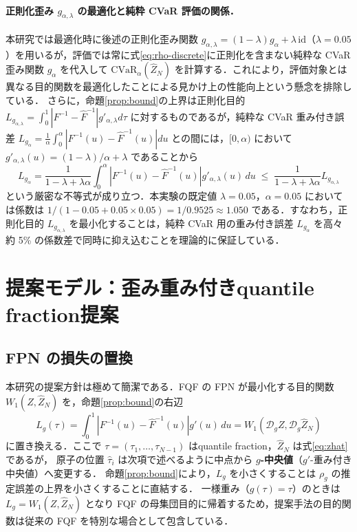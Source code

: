 \documentclass[a4paper,10pt]{jsarticle}
\theoremstyle{definition}
\newcommand{\CVaR}{\mathrm{CVaR}}
\newcommand{\Wone}{W_1}
\newcommand{\Finv}{F^{-1}}
\newcommand{\Fhinv}{\hat{F}^{-1}}
\newcommand{\dist}{\mathcal{D}_g}
\begin{document}
\paragraph{正則化歪み $g_{\alpha,\lambda}$ の最適化と純粋 CVaR 評価の関係．}
本研究では最適化時に後述の正則化歪み関数 $g_{\alpha,\lambda}=(1-\lambda)g_\alpha+\lambda\,\mathrm{id}$（$\lambda=0.05$）を用いるが，評価では常に式\eqref{eq:rho-discrete}に正則化を含まない純粋な CVaR 歪み関数 $g_\alpha$ を代入して $\CVaR_\alpha(\hat Z_N)$ を計算する．これにより，評価対象とは異なる目的関数を最適化したことによる見かけ上の性能向上という懸念を排除している．
さらに，命題\ref{prop:bound}の上界は正則化目的 $L_{g_{\alpha,\lambda}}=\int_0^1|\Finv-\Fhinv|g'_{\alpha,\lambda}d\tau$ に対するものであるが，純粋な CVaR 重み付き誤差 $L_{g_\alpha}=\frac1\alpha\int_0^\alpha|\Finv(u)-\Fhinv(u)|du$ との間には，$[0,\alpha)$ において $g'_{\alpha,\lambda}(u)=(1-\lambda)/\alpha+\lambda$ であることから
\begin{equation}
  L_{g_\alpha}=\frac{1}{1-\lambda+\lambda\alpha}\int_0^\alpha|\Finv(u)-\Fhinv(u)|g'_{\alpha,\lambda}(u)\,du
  \;\le\; \frac{1}{1-\lambda+\lambda\alpha} L_{g_{\alpha,\lambda}}
  \label{eq:reg-bound-relation}
\end{equation}
という厳密な不等式が成り立つ．本実験の既定値 $\lambda=0.05$，$\alpha=0.05$ においては係数は $1/(1-0.05+0.05\times0.05)=1/0.9525\approx1.050$ である．すなわち，正則化目的 $L_{g_{\alpha,\lambda}}$ を最小化することは，純粋 CVaR 用の重み付き誤差 $L_{g_\alpha}$ を高々約 5\% の係数差で同時に抑え込むことを理論的に保証している．

\section{提案モデル：歪み重み付きquantile fraction提案}
\label{sec:proposed}

\subsection{FPN の損失の置換}
本研究の提案方針は極めて簡潔である．FQF の FPN が最小化する目的関数
$\Wone(Z,\hat Z_N)$ を，命題\ref{prop:bound}の右辺
\begin{equation}
  L_g(\tau)=\int_0^1\left|\Finv(u)-\Fhinv(u)\right|g'(u)\,du=\Wone(\dist Z,\dist\hat Z_N)
  \label{eq:Lg}
\end{equation}
に置き換える．ここで $\tau=(\tau_1,\dots,\tau_{N-1})$ はquantile fraction，$\hat Z_N$ は式\eqref{eq:zhat}であるが，
原子の位置 $\hat\tau_i$ は次項で述べるように中点から \textbf{$g$-中央値}（$g'$-重み付き中央値）へ変更する．
命題\ref{prop:bound}により，$L_g$ を小さくすることは $\rho_g$ の推定誤差の上界を小さくすることに直結する．
一様重み（$g(\tau)=\tau$）のときは $L_g=\Wone(Z,\hat Z_N)$ となり FQF の母集団目的に帰着するため，提案手法の目的関数は従来の FQF を特別な場合として包含している．
\end{document}
